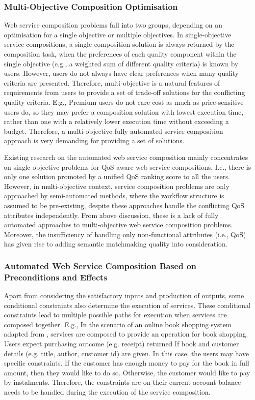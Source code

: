 \subsubsection{Multi-Objective Composition Optimisation}
Web service composition problems fall into two groups, depending on an optimisation for a single objective or multiple objectives. In single-objective service compositions, a single composition solution is always returned by the composition task, when the preferences of each quality component within the single objective (e.g., a weighted sum of different quality criteria) is known by users. However, users do not always have clear preferences when many quality criteria are presented. Therefore, multi-objective is a natural features of requirements from users to provide a set of trade-off solutions for the conflicting quality criteria. E.g., Premium users do not care cost as much as price-sensitive users do, so they may prefer a composition solution with lowest execution time,  rather than one with a relatively lower execution time without exceeding a budget. Therefore, a multi-objective  fully automated service composition approach is very demanding for providing a set of solutions.

Existing research on the automated web service composition mainly concentrates on single objective problems for QoS-aware web service compositions. I.e., there is only one solution promoted by a unified QoS ranking score to all the users. However, in multi-objective context, service composition problems  \cite{liu2005dynamic,wada2012e3,yin2014hybrid} are only approached by semi-automated methods, where the workflow structure is assumed to be pre-existing, despite these approaches handle the conflicting QoS attributes independently. From above discussion, these is a lack of fully automated approaches to multi-objective web service composition problems. Moreover, the insufficiency of handling only non-functional attributes (i.e., QoS) has given rise to adding semantic matchmaking quality into consideration.

\subsubsection{Automated Web Service Composition Based on Preconditions and Effects}
Apart from considering the satisfactory inputs and production of outputs, some conditional constraints also determine the execution of services.  These conditional constraints lead to multiple possible paths for execution when services are composed together. E.g., In the scenario of an online book shopping system adapted from \cite{wang2014automated}, services are composed to provide an operation for book shopping.  Users expect purchasing outcome (e.g. receipt) returned If book and customer details (e.g. title, author, customer id) are given. In this case, the users may have specific constraints. If the customer has enough money to pay for the book in full amount, then they would like to do so. Otherwise, the customer would like to pay by instalments. Therefore, the constraints are on their current account balance needs to be handled during the execution of the service composition.

